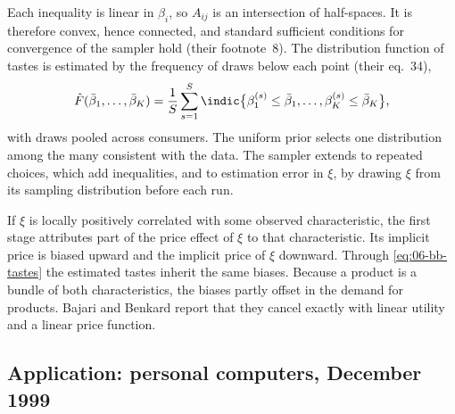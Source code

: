 Each inequality is linear in $\beta_i$, so $A_{ij}$ is an intersection of half-spaces. It is therefore convex, hence
connected, and standard sufficient conditions for convergence of the sampler hold (their footnote~8). The distribution
function of tastes is estimated by the frequency of draws below each point (their eq.~34),
\begin{equation}\label{eq:06-bb-cdf}
  \hat F(\bar\beta_1, \dots, \bar\beta_K) = \frac{1}{S}\sum_{s=1}^{S} \indic\bigl\{\beta^{(s)}_1 \le \bar\beta_1, \dots, \beta^{(s)}_K \le \bar\beta_K\bigr\} ,
\end{equation}
with draws pooled across consumers. The uniform prior selects one distribution among the many consistent with the data. The
sampler extends to repeated choices, which add inequalities, and to estimation error in $\xi$, by drawing $\xi$ from its
sampling distribution before each run.

If $\xi$ is locally positively correlated with some observed characteristic, the first stage attributes part of the price
effect of $\xi$ to that characteristic. Its implicit price is biased upward and the implicit price of $\xi$ downward. Through
\eqref{eq:06-bb-tastes} the estimated tastes inherit the same biases. Because a product is a bundle of both characteristics,
the biases partly offset in the demand for products. Bajari and Benkard report that they cancel exactly with linear utility
and a linear price function.

\subsection{Application: personal computers, December 1999}\label{sec:06-bb-pc}

